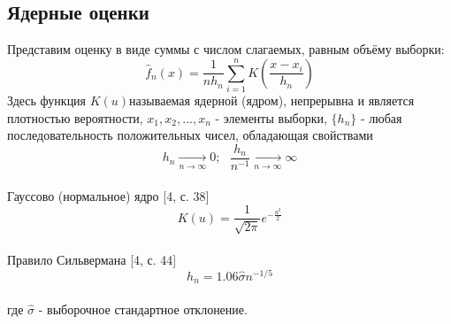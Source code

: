 	\subsection {Ядерные оценки}
		Представим оценку в виде суммы с числом слагаемых, равным объёму выборки: \\
		\begin{equation} \hat{f}_n(x) = \frac{1}{nh_n}\sum_{i=1}^{n}K(\frac{x-x_i}{h_n})\end{equation}
		Здесь функция $K(u)$называемая ядерной (ядром), непрерывна и является плотностью вероятности, $x_1, x_2, ..., x_n$ - элементы выборки, $\{h_n\}$ - любая последовательность положительных чисел, обладающая свойствами\\
	\begin{equation} h_n \underset{n\to \infty}{\longrightarrow} 0;\ \ \ \frac{h_n}{n^{-1}} \underset{n \to \infty}{\longrightarrow} \infty \end{equation}\\
	Гауссово (нормальное) ядро [4, с. 38]\\
	\begin{equation} K(u) = \frac{1}{\sqrt{2\pi}}e^{-\frac{u^2}{2}}\end{equation}\\
	Правило Сильвермана [4, с. 44]\\
	\begin{equation} h_n = 1.06\hat{\sigma}n^{-1/5}\end{equation}\\
	где $\hat{\sigma}$ - выборочное стандартное отклонение.
